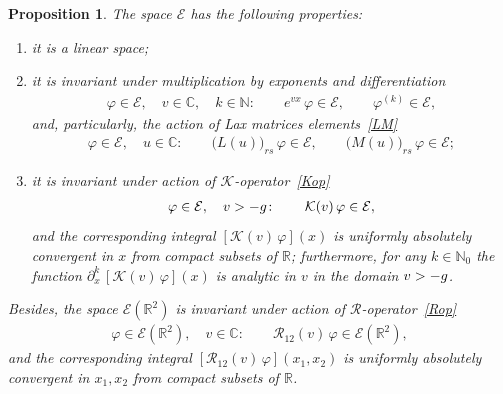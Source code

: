 \documentclass[11pt]{article}
\numberwithin{equation}{section}
\theoremstyle{plain}
\newtheorem{proposition}{Proposition}
\theoremstyle{definition}
\let\Im\relax
\DeclareMathOperator{\Im}{Im}
\renewcommand{\phi}{\varphi}
\begin{document}
\begin{proposition} \label{prop:Espace}
	The space $\mathcal{E}$ has the following properties:
	\begin{enumerate}
		\item[(1)] it is a linear space;
		\item[(2)] it is invariant under multiplication by exponents and differentiation
		\begin{align}\label{EDphi}
			\phi \in \mathcal{E}, \quad v \in \mathbb{C}, \quad k \in \mathbb{N} \colon \qquad e^{v x} \, \phi \in \mathcal{E}, \qquad \phi^{(k)} \in \mathcal{E},
		\end{align}
		and, particularly, the action of Lax matrices elements~\eqref{LM}
		\begin{align}\label{LMphi}
			\phi \in \mathcal{E}, \quad u \in \mathbb{C} \colon \qquad \bigl(L(u)\bigr)_{rs} \, \phi \in \mathcal{E}, \qquad \bigl(M(u)\bigr)_{rs} \, \phi \in \mathcal{E};
		\end{align}
		\item[(3)] it is invariant under action of $\mathcal{K}$-operator~\eqref{Kop}
		\begin{align}
			\phi \in \mathcal{E}, \quad \Im v > -g \colon \qquad \mathcal{K}(v) \, \phi \in \mathcal{E},
		\end{align}
		and the corresponding integral $[\mathcal{K} (v)\, \phi] (x)$ is uniformly absolutely convergent in $x$ from compact subsets of $\mathbb{R}$; furthermore, for any $k \in \mathbb{N}_0$ the function $\partial_x^k \, [\mathcal{K} (v)\, \phi] (x)$ is analytic in $v$ in the domain $\Im v > -g$.
	\end{enumerate}
	Besides, the space $\mathcal{E}(\mathbb{R}^2)$ is invariant under action of $\mathcal{R}$-operator~\eqref{Rop}
		\begin{align}\label{Rphi}
			\phi \in \mathcal{E}(\mathbb{R}^2), \quad v\in \mathbb{C}\colon \qquad \mathcal{R}_{12} (v)\, \phi  \in \mathcal{E}(\mathbb{R}^2),
		\end{align}
	and the corresponding integral $[\mathcal{R}_{12} (v)\, \phi] (x_1, x_2)$ is uniformly absolutely convergent in $x_1, x_2$ from compact subsets of $\mathbb{R}$.
\end{proposition}
\end{document}
